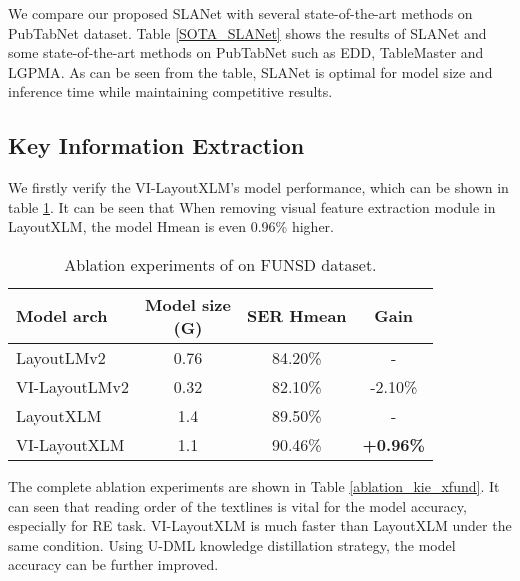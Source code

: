 \documentclass[letterpaper]{article} \usepackage{aaai21}  \usepackage{times}  \usepackage{helvet} \usepackage{courier}  \usepackage[hyphens]{url}  \usepackage{graphicx} \usepackage{algorithm}
\begin{document}
We compare our proposed SLANet with several state-of-the-art methods on PubTabNet dataset. Table \ref{SOTA_SLANet} shows the results of SLANet and some state-of-the-art methods on PubTabNet such as EDD\cite{EDD}, TableMaster\cite{TableMaster} and LGPMA\cite{Lgpma}. As can be seen from the table, SLANet is optimal for model size and inference time while maintaining competitive results.


\subsection{Key Information Extraction}

We firstly verify the VI-LayoutXLM's model performance, which can be shown in table \ref{ablation_kie_vi_layoutxlm}. It can be seen that When removing visual feature extraction module in LayoutXLM, the model Hmean is even 0.96\% higher.

\begin{table}[t]
\begin{center}
\begin{tabular}{l|c|c|c}
\hline
Model arch & \makecell{Model size \\ (G)}  & SER Hmean & Gain \\
\hline
LayoutLMv2 & 0.76 & 84.20\% & - \\
VI-LayoutLMv2 & 0.32 & 82.10\% & -2.10\% \\
LayoutXLM & 1.4 & 89.50\% & - \\
VI-LayoutXLM & 1.1 & 90.46\% & \textbf{+0.96\%} \\
\hline
\end{tabular}
\end{center}
\caption{Ablation experiments of on FUNSD dataset.}
\label{ablation_kie_vi_layoutxlm}
\end{table}

The complete ablation experiments are shown in Table \ref{ablation_kie_xfund}. It can seen that reading order of the textlines is vital for the model accuracy, especially for RE task. VI-LayoutXLM is much faster than LayoutXLM under the same condition. Using U-DML knowledge distillation strategy, the model accuracy can be further improved.
\end{document}
